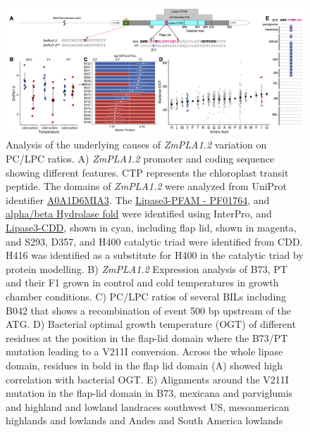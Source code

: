 \documentclass[9pt,twocolumn,twoside,lineno]{BioRxiv}
\begin{document}
\begin{figure}[ht]
\begin{center}
\includegraphics[width=0.8\paperwidth]{Figures/Fig_4.png}
\caption{Analysis of the underlying causes of \textit{ZmPLA1.2} variation on PC/LPC ratios.    
A) \textit{ZmPLA1.2} promoter and coding sequence showing different features. CTP represents the chloroplast transit peptide. The domains of \textit{ZmPLA1.2} were analyzed from UniProt identifier \hyperlink{https://www.uniprot.org/uniprot/A0A1D6MIA3}{A0A1D6MIA3}. The \hyperlink{https://www.ebi.ac.uk/interpro/entry/pfam/PF01764/}{Lipase3-PFAM - PF01764}, and \hyperlink{https://www.ebi.ac.uk/interpro/entry/InterPro/IPR029058/}{alpha/beta Hydrolase fold} were identified using InterPro, and \hyperlink{https://www.ncbi.nlm.nih.gov/Structure/cdd/cddsrv.cgi?uid=cd00519}{Lipase3-CDD}, shown in cyan, including flap lid, shown in magenta, and S293, D357, and H400 catalytic triad were identified from CDD. H416 was identified as a substitute for H400 in the catalytic triad by protein modelling.
B) \textit{ZmPLA1.2} Expression analysis of B73, PT and their F1 grown in control and cold temperatures in growth chamber conditions. 
C) PC/LPC ratios of several BILs including B042 that shows a recombination of event 500 bp upstream of the ATG.
D) Bacterial optimal growth temperature (OGT) of different residues at the position in the flap-lid domain where the B73/PT mutation leading to a V211I conversion. Across the whole lipase domain, residues in bold in the flap lid domain (A) showed high correlation with bacterial OGT. 
E) Alignments around the V211I mutation in the flap-lid domain in B73, mexicana and parviglumis and highland and lowland landraces southwest US, mesoamerican highlands and lowlands and Andes and South America lowlands} 
\label{Fig4}
\end{center}
\end{figure} 
\end{document}

